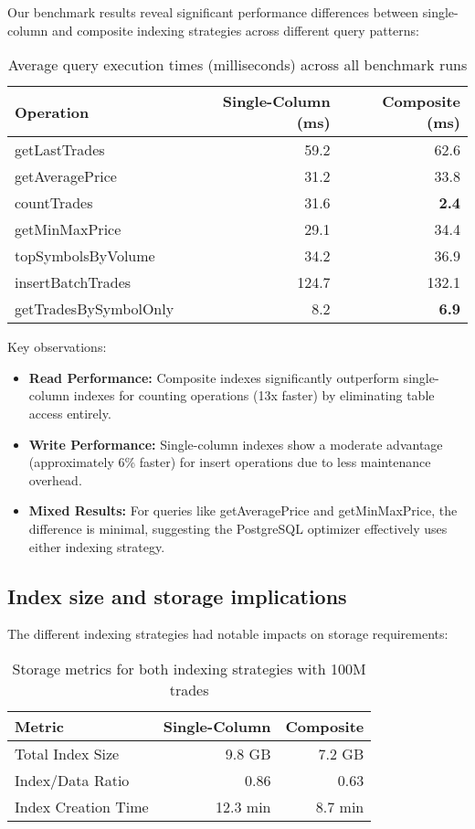 \documentclass[11pt,a4paper]{article}
\begin{document}
Our benchmark results reveal significant performance differences between single-column and composite indexing strategies across different query patterns:

\begin{table}[h]
\centering
\begin{tabular}{lrr}
\toprule
\textbf{Operation} & \textbf{Single-Column (ms)} & \textbf{Composite (ms)} \\
\midrule
getLastTrades & 59.2 & 62.6 \\
getAveragePrice & 31.2 & 33.8 \\
countTrades & 31.6 & \textbf{2.4} \\
getMinMaxPrice & 29.1 & 34.4 \\
topSymbolsByVolume & 34.2 & 36.9 \\
insertBatchTrades & 124.7 & 132.1 \\
getTradesBySymbolOnly & 8.2 & \textbf{6.9} \\
\bottomrule
\end{tabular}
\caption{Average query execution times (milliseconds) across all benchmark runs}
\end{table}

Key observations:
\begin{itemize}
    \item \textbf{Read Performance:} Composite indexes significantly outperform single-column indexes for counting operations (13x faster) by eliminating table access entirely.
    
    \item \textbf{Write Performance:} Single-column indexes show a moderate advantage (approximately 6\% faster) for insert operations due to less maintenance overhead.
    
    \item \textbf{Mixed Results:} For queries like getAveragePrice and getMinMaxPrice, the difference is minimal, suggesting the PostgreSQL optimizer effectively uses either indexing strategy.
\end{itemize}

\subsection{Index size and storage implications}

The different indexing strategies had notable impacts on storage requirements:

\begin{table}[h]
\centering
\begin{tabular}{lrr}
\toprule
\textbf{Metric} & \textbf{Single-Column} & \textbf{Composite} \\
\midrule
Total Index Size & 9.8 GB & 7.2 GB \\
Index/Data Ratio & 0.86 & 0.63 \\
Index Creation Time & 12.3 min & 8.7 min \\
\bottomrule
\end{tabular}
\caption{Storage metrics for both indexing strategies with 100M trades}
\end{table}
\end{document}
